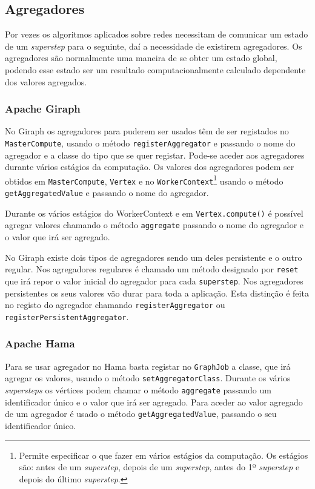 \newpage

\subsection{Agregadores}
  Por vezes os algoritmos aplicados sobre redes necessitam de comunicar um 
estado de um \textit{superstep} para o seguinte, daí a necessidade de existirem 
agregadores. Os agregadores são normalmente uma maneira de se obter um estado 
global, podendo esse estado ser um resultado computacionalmente calculado 
dependente dos valores agregados.

  \subsubsection*{Apache Giraph}
    No Giraph os agregadores para puderem ser usados têm de ser registados no 
\texttt{MasterCompute}, usando o método \texttt{registerAggregator} e
    passando o nome do agregador e a classe do tipo que se quer registar. 
Pode-se aceder aos agregadores durante vários estágios da computação.
    Os valores dos agregadores podem ser obtidos em \texttt{MasterCompute}, 
\texttt{Vertex} e no \texttt{WorkerContext}\footnote{Permite 
especificar o que fazer em vários estágios da computação. Os estágios são: 
antes de um \textit{superstep}, depois de um \textit{superstep}, antes do 1º \textit{superstep} e depois do 
último \textit{superstep}.} usando o método \texttt{getAggregatedValue} e 
passando
    o nome do agregador.
    
    Durante os vários estágios do WorkerContext e em \texttt{Vertex.compute()} é possível agregar valores chamando o 
método \texttt{aggregate} passando o nome do agregador e o valor que irá ser agregado.
    
    No Giraph existe dois tipos de agregadores sendo um deles persistente e o 
outro regular. Nos agregadores regulares é chamado um método
    designado por \texttt{reset} que irá repor o valor inicial do agregador 
para cada \texttt{superstep}. Nos agregadores persistentes os seus valores vão 
durar
    para toda a aplicação. Esta distinção é feita no registo do agregador chamando \texttt{registerAggregator} 
    ou \texttt{registerPersistentAggregator}.
    
  \subsubsection*{Apache Hama}
    Para se usar agregador no Hama basta registar no \texttt{GraphJob} a classe, que irá agregar os valores, usando o método
    \texttt{setAggregatorClass}. Durante os vários \textit{supersteps} os 
vértices podem chamar o método \texttt{aggregate} passando um identificador 
único
    e o valor que irá ser agregado. Para aceder ao valor agregado de um 
agregador é usado o método \texttt{getAggregatedValue}, passando o seu 
    identificador único.
    
